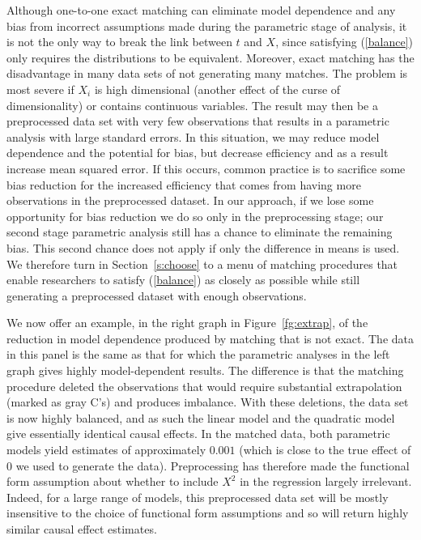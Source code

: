 \documentclass[11pt,titlepage]{article}
\begin{document}
Although one-to-one exact matching can eliminate model dependence and
any bias from incorrect assumptions made during the parametric stage
of analysis, it is not the only way to break the link between $t$ and
$X$, since satisfying (\ref{balance}) only requires the distributions
to be equivalent.  Moreover, exact matching has the disadvantage in
many data sets of not generating many matches.  The problem is most
severe if $X_i$ is high dimensional (another effect of the curse of
dimensionality) or contains continuous variables.  The result may then
be a preprocessed data set with very few observations that results in
a parametric analysis with large standard errors.  In this situation,
we may reduce model dependence and the potential for bias, but
decrease efficiency and as a result increase mean squared error.  If
this occurs, common practice is to sacrifice some bias reduction for
the increased efficiency that comes from having more observations in
the preprocessed dataset.  In our approach, if we lose some
opportunity for bias reduction we do so only in the preprocessing
stage; our second stage parametric analysis still has a chance to
eliminate the remaining bias.  This second chance does not apply if
only the difference in means is used.  We therefore turn in
Section~\ref{s:choose} to a menu of matching procedures that enable
researchers to satisfy (\ref{balance}) as closely as possible while
still generating a preprocessed dataset with enough observations.

We now offer an example, in the right graph in Figure~\ref{fg:extrap},
of the reduction in model dependence produced by matching that is not
exact.  The data in this panel is the same as that for which the
parametric analyses in the left graph gives highly model-dependent
results.  The difference is that the matching procedure deleted the
observations that would require substantial extrapolation (marked as
gray C's) and produces imbalance.  With these deletions, the data set
is now highly balanced, and as such the linear model and the quadratic
model give essentially identical causal effects.  In the matched data,
both parametric models yield estimates of approximately $0.001$ (which
is close to the true effect of $0$ we used to generate the data).
Preprocessing has therefore made the functional form assumption about
whether to include $X^2$ in the regression largely irrelevant.
Indeed, for a large range of models, this preprocessed data set will
be mostly insensitive to the choice of functional form assumptions and
so will return highly similar causal effect estimates.
\end{document}
